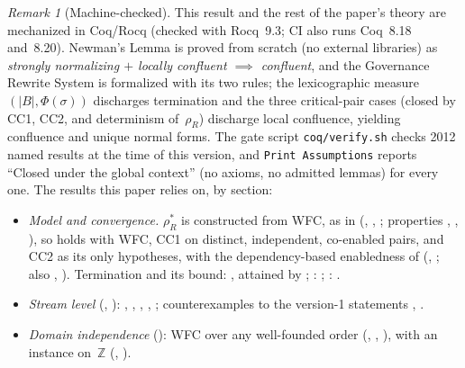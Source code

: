 \documentclass[11pt,a4paper]{article}
\theoremstyle{plain}
\theoremstyle{definition}
\theoremstyle{remark}
\newtheorem{remark}[theorem]{Remark}
\begin{document}
\begin{remark}[Machine-checked]
\label{sec:mechanization}
This result and the rest of the paper's theory are mechanized in Coq/Rocq
(checked with Rocq~9.3; CI also runs Coq~8.18 and~8.20).  Newman's Lemma is
proved from scratch (no external libraries) as \emph{strongly normalizing
$+$ locally confluent $\implies$ confluent}, and the Governance Rewrite System
is formalized with its two rules; the lexicographic measure
$(|B|, \Phi(\sigma))$ discharges termination and the three critical-pair cases
(closed by CC1, CC2, and determinism of~$\rho_R$) discharge local confluence,
yielding confluence and unique normal forms.  The gate script
\texttt{coq/verify.sh} checks 2012 named results at the time of this version, and \texttt{Print
Assumptions} reports ``Closed under the global context'' (no axioms, no
admitted lemmas) for every one.  The results this paper relies on, by
section:
\begin{itemize}[leftmargin=*,nosep]
\item \emph{Model and convergence.}  $\rho_R^*$ is constructed from WFC, as
  in  (,
  , ; properties
  , , ), so
   holds with WFC, CC1 on distinct, independent,
  co-enabled pairs, and CC2 as its only hypotheses, with the
  dependency-based enabledness of 
  (,
  ; also
  ,
  ).  Termination and its bound:
  , attained by
  ; :
  ; :
  .
\item \emph{Stream level} (, ):
  , ,
  , ,
  ; counterexamples to the version-1 statements
  ,
  .
\item \emph{Domain independence} (): WFC over any
  well-founded order (,
  , ), with an
  instance on~$\mathbb{Z}$ (, ).

\end{itemize}
\end{remark}
\end{document}
